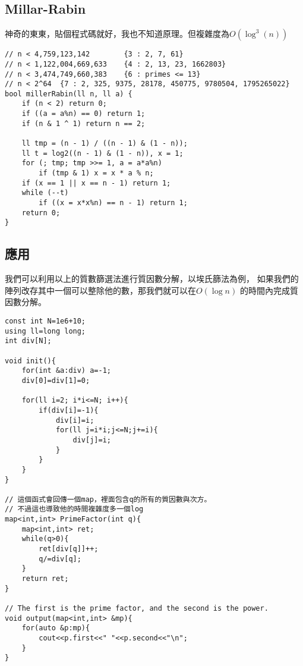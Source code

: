     \subsection{Millar-Rabin}

    神奇的東東，貼個程式碼就好，我也不知道原理。但複雜度為$O(\log^{3}{(n)})$

\begin{lstlisting}[caption=Millar-Rabin 質數判斷]
// n < 4,759,123,142        {3 : 2, 7, 61}
// n < 1,122,004,669,633    {4 : 2, 13, 23, 1662803}
// n < 3,474,749,660,383    {6 : primes <= 13}
// n < 2^64  {7 : 2, 325, 9375, 28178, 450775, 9780504, 1795265022}
bool millerRabin(ll n, ll a) {
    if (n < 2) return 0;
    if ((a = a%n) == 0) return 1;
    if (n & 1 ^ 1) return n == 2;
    
    ll tmp = (n - 1) / ((n - 1) & (1 - n));
    ll t = log2((n - 1) & (1 - n)), x = 1;
    for (; tmp; tmp >>= 1, a = a*a%n)
        if (tmp & 1) x = x * a % n;
    if (x == 1 || x == n - 1) return 1;
    while (--t)
        if ((x = x*x%n) == n - 1) return 1;
    return 0;
}
\end{lstlisting}

    \subsection{應用}
    我們可以利用以上的質數篩選法進行質因數分解，以埃氏篩法為例，
    如果我們的陣列改存其中一個可以整除他的數，那我們就可以在$O(\log{n})$
    的時間內完成質因數分解。

\begin{lstlisting}[caption=埃氏篩法]
const int N=1e6+10;
using ll=long long;
int div[N];

void init(){
    for(int &a:div) a=-1;
    div[0]=div[1]=0;
    
    for(ll i=2; i*i<=N; i++){
        if(div[i]=-1){
            div[i]=i;
            for(ll j=i*i;j<=N;j+=i){
                div[j]=i;
            }
        }
    }
}

// 這個函式會回傳一個map，裡面包含q的所有的質因數與次方。
// 不過這也導致他的時間複雜度多一個log
map<int,int> PrimeFactor(int q){
    map<int,int> ret;
    while(q>0){
        ret[div[q]]++;
        q/=div[q];
    }
    return ret;
}

// The first is the prime factor, and the second is the power.
void output(map<int,int> &mp){
    for(auto &p:mp){
        cout<<p.first<<" "<<p.second<<"\n";
    }
}
\end{lstlisting}

